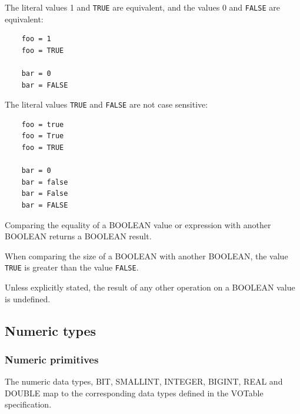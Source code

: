\documentclass[11pt,a4paper]{ivoa}
\newcommand{\VOTspec}{VOTable specification\xspace}
\begin{document}
The literal values 1 and \verb:TRUE: are equivalent,
and the values 0 and \verb:FALSE: are equivalent:
\begin{verbatim}
    foo = 1
    foo = TRUE

    bar = 0
    bar = FALSE
\end{verbatim}

The literal values \verb:TRUE: and \verb:FALSE:
are not case sensitive:
\begin{verbatim}
    foo = true
    foo = True
    foo = TRUE

    bar = 0
    bar = false
    bar = False
    bar = FALSE
\end{verbatim}

Comparing the equality of a BOOLEAN value or expression with another
BOOLEAN returns a BOOLEAN result.

When comparing the size of a BOOLEAN with another BOOLEAN, the value
\verb:TRUE: is greater than the value \verb:FALSE:.

Unless explicitly stated, the result of any other operation on a BOOLEAN
value is undefined.

\subsection{Numeric types}
\label{sec:types.numeric}

\subsubsection{Numeric primitives}
\label{sec:types.numeric.primitive}

The numeric data types, BIT, SMALLINT, INTEGER, BIGINT, REAL
and DOUBLE map to the corresponding data types defined
in the \VOTspec.
\end{document}

